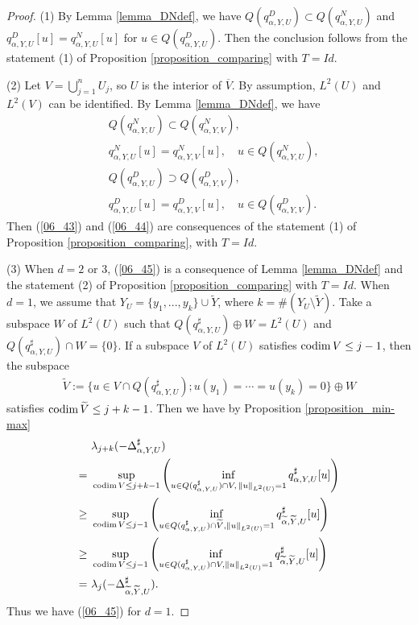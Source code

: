 \documentclass[12pt,a4paper]{article}
\def\codim{\mathop{\rm codim}\nolimits}
\begin{document}
\begin{proof}
(1) 
By Lemma \ref{lemma_DNdef},
we have $Q(q^D_{\alpha,Y,U})\subset Q(q^N_{\alpha,Y,U})$
and $q^D_{\alpha,Y,U}[u]=q^N_{\alpha,Y,U}[u]$
for $u\in Q(q^D_{\alpha,Y,U})$.
Then the conclusion follows from 
the statement (1) of Proposition \ref{proposition_comparing}
with $T=Id$.


(2)
Let $V=\bigcup_{j=1}^n U_j$,
so $U$ is the interior of $\overline{V}$.
By assumption, $L^2(U)$ and $L^2(V)$ can be identified.
By Lemma \ref{lemma_DNdef},
we have 
\begin{align*}
& Q(q^N_{\alpha,Y,U})
\subset
Q(q^N_{\alpha,Y,V}),\\
&q^N_{\alpha,Y,U}[u]
=q^N_{\alpha,Y,V}[u],\quad
u\in Q(q^N_{\alpha,Y,U}),\\
& Q(q^D_{\alpha,Y,U})
\supset
Q(q^D_{\alpha,Y,V}),\\
&q^D_{\alpha,Y,U}[u]
=q^D_{\alpha,Y,V}[u],\quad
u\in Q(q^D_{\alpha,Y,V}).
\end{align*}
Then (\ref{06_43}) and (\ref{06_44}) 
are consequences of 
the statement (1) of Proposition \ref{proposition_comparing},
with $T=Id$.

(3)
When $d=2$ or $3$,
(\ref{06_45}) is a consequence of
Lemma \ref{lemma_DNdef}
and the statement (2) of Proposition \ref{proposition_comparing} with $T=Id$.
When $d=1$,
we assume that $Y_U=\{y_1,...,y_k\}\cup\widetilde{Y}$, where $k=\#(Y_U\setminus\widetilde{Y})$.
Take a subspace $W$ of $L^2(U)$ such that 
$Q(q^\sharp_{\alpha,Y,U})\oplus W=L^2(U)$ and 
$Q(q^\sharp_{\alpha,Y,U})\cap W=\{0\}$.
If a subspace $V$ of $L^2(U)$ satisfies $\codim V\leq j-1$,
then the subspace
\begin{align*}
 \widetilde{V}:=\{u\in V\cap Q(q^\sharp_{\alpha,Y,U});u(y_1)=\cdots=u(y_k)=0\}\oplus W
\end{align*}
satisfies $\codim \widetilde{V}\leq j+k-1$.
Then we have by Proposition \ref{proposition_min-max}
\begin{align*}
&\  \lambda_{j+k}(-\Delta^\sharp_{\alpha,Y,U})\\
=&\ 
\sup_{\codim V\leq j+k-1}
\left(
\inf_{u\in Q(q^\sharp_{\alpha,Y,U})\cap V,\,\|u\|_{L^2(U)}=1}q^\sharp_{\alpha,Y,U}[u]\right)\\
\geq &\ 
\sup_{\codim V\leq j-1}
\left(
\inf_{u\in Q(q^\sharp_{\alpha,Y,U})\cap \widetilde{V},\|u\|_{L^2(U)}=1}q^\sharp_{\widetilde{\alpha},\widetilde{Y},U}[u]\right)\\
\geq &\ 
\sup_{\codim V\leq j-1}
\left(
\inf_{u\in Q(q^\sharp_{\alpha,Y,U})\cap V,\|u\|_{L^2(U)}=1}q^\sharp_{\widetilde\alpha,\widetilde{Y},U}[u]\right)\\
=&\ \lambda_{j}(-\Delta_{\widetilde{\alpha},\widetilde{Y},U}^\sharp).
\end{align*}
Thus we have (\ref{06_45}) for $d=1$.
\end{proof}
\end{document}
